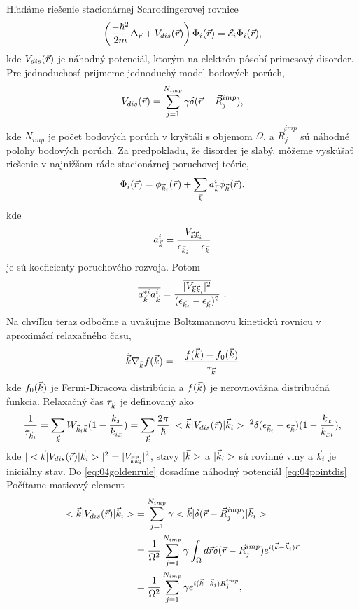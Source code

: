 Hľadáme riešenie stacionárnej Schrodingerovej rovnice
\begin{equation}
\left(\frac{-\hbar^2}{2m}\Delta_{\vec{r}} + V_{dis}(\vec{r})\right)\Phi_i(\vec{r}) = \mathcal{E}_i \Phi_{i}(\vec{r})
  \text{,}
\end{equation}
kde $V_{dis}(\vec{r})$ je náhodný potenciál, ktorým na elektrón pôsobí primesový disorder. Pre jednoduchosť prijmeme jednoduchý model bodových porúch,
\begin{align}
\label{eq:04pointdis}
V_{dis}(\vec{r})=\sum_{j=1}^{N_{imp}}\gamma \delta(\vec{r}-\vec R_j^{imp})\text{,}
\end{align}
kde $N_{imp}$ je počet bodových porúch v kryštáli s objemom $\Omega$, a $\vec R^{imp}_j$ sú náhodné polohy bodových porúch.
Za predpokladu, že disorder je slabý, môžeme vyskúšať riešenie v najnižšom ráde stacionárnej poruchovej teórie,
\begin{align}
\label{nulta}
\Phi_i(\vec{r})=\phi_{\vec{k}_i}(\vec{r})+\sum_{\vec{k}} a^i_{\vec{k}} \phi_{\vec{k}}(\vec{r})\text{,}
\end{align}
kde
\begin{equation}
a^i_{\vec{k}} = \frac{V_{\vec{k}\vec{k}_i}}{\epsilon_{\vec{k}_i}-\epsilon_{\vec{k}}}
\end{equation}
je sú koeficienty poruchového rozvoja. Potom
\begin{align}
\label{eq:04coef}
\overline{a^{*i}_{\vec{k}}a^i_{\vec{k}}}=
\frac{\overline{|V_{\vec{k}\vec{k}_i}|^2}}{(\epsilon_{\vec{k}_i}-\epsilon_{\vec{k}})^2}
\ \text{.}
\end{align}
Na chvíľku teraz odbočme a uvažujme Boltzmannovu kinetickú rovnicu v aproximácí relaxačného času,
\begin{align}
\dot{\vec{k}}\nabla_{\vec{k}}f(\vec{k})=-\frac{f(\vec{k})-f_0(\vec{k})}{\tau_{\vec{k}}}
\end{align}
kde $f_0(\vec{k})$ je Fermi-Diracova distribúcia a $f(\vec{k})$ je nerovnovážna distribučná funkcia. Relaxačný čas  $\tau_{\vec{k}}$ je definovaný ako
\begin{align}
\label{eq:04goldenrule}
\frac{1}{\tau_{\vec{k}_i}}=\sum_{\vec{k}}W_{\vec{k}_i\vec{k}}(1-\frac{k_x}{k_{ix}}) = \sum_{\vec{k}}\frac{2\pi}{\hbar}|<\vec{k}|V_{dis}(\vec{r})|\vec{k}_i>|^2\delta(\epsilon_{\vec{k}_i}-\epsilon_{\vec{k}})(1-\frac{k_x}{k_{xi}}) \text{,}
\end{align}
kde $|<\vec{k}|V_{dis}(\vec{r})|\vec{k}_i>|^2=|V_{\vec{k}\vec{k}_i}|^2$,
 stavy $|\vec{k}>$ a $|\vec{k}_i>$ sú rovinné vlny  a  $\vec{k}_i$ je iniciálny stav.
Do \eqref{eq:04goldenrule} dosadíme náhodný potenciál \eqref{eq:04pointdis}
Počítame maticový element
\begin{align}
\label{eq:04vdisElement}
\notag
<\vec{k}|V_{dis}(\vec{r})|\vec{k}_i>&=\sum_{j=1}^{N_{imp}}\gamma<\vec{k}|\delta(\vec{r}-\vec R^{imp}_j)|\vec{k}_i>\\
\notag
&=\frac{1}{\Omega^2}\sum_{j=1}^{N_{imp}}\gamma\int_{\Omega}d\vec{r}\delta(\vec{r} -\vec R_j^{imp})e^{i(\vec{k}-\vec{k}_i)\vec{r}}\\
&=\frac{1}{\Omega^2}\sum_{j=1}^{N_{imp}}\gamma e^{i(\vec{k}-\vec{k}_i)R_j^{imp}} \text{,}
\end{align}
